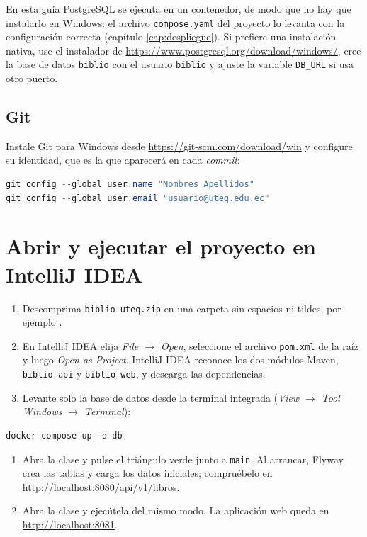En esta guía PostgreSQL se ejecuta en un contenedor, de modo que no hay que instalarlo en Windows: el archivo \texttt{compose.yaml} del proyecto lo levanta con la configuración correcta (capítulo \ref{cap:despliegue}). Si prefiere una instalación nativa, use el instalador de \url{https://www.postgresql.org/download/windows/}, cree la base de datos \texttt{biblio} con el usuario \texttt{biblio} y ajuste la variable \texttt{DB\_URL} si usa otro puerto.

\subsection{Git}

Instale Git para Windows desde \url{https://git-scm.com/download/win} y configure su identidad, que es la que aparecerá en cada \emph{commit}:

\begin{lstlisting}[language=powershell,numbers=none]
git config --global user.name "Nombres Apellidos"
git config --global user.email "usuario@uteq.edu.ec"
\end{lstlisting}

\section{Abrir y ejecutar el proyecto en IntelliJ IDEA}

\begin{enumerate}
	\item Descomprima \texttt{biblio-uteq.zip} en una carpeta sin espacios ni tildes, por ejemplo .
	\item En IntelliJ IDEA elija \emph{File $\rightarrow$ Open}, seleccione el archivo \texttt{pom.xml} de la raíz y luego \emph{Open as Project}. IntelliJ IDEA reconoce los dos módulos Maven, \texttt{biblio-api} y \texttt{biblio-web}, y descarga las dependencias.
	\item Levante solo la base de datos desde la terminal integrada (\emph{View $\rightarrow$ Tool Windows $\rightarrow$ Terminal}):
\end{enumerate}

\begin{lstlisting}[language=powershell,numbers=none]
docker compose up -d db
\end{lstlisting}

\begin{enumerate}[resume]
	\item Abra la clase  y pulse el triángulo verde junto a \texttt{main}. Al arrancar, Flyway crea las tablas y carga los datos iniciales; compruébelo en \url{http://localhost:8080/api/v1/libros}.
	\item Abra la clase  y ejecútela del mismo modo. La aplicación web queda en \url{http://localhost:8081}.
\end{enumerate}

